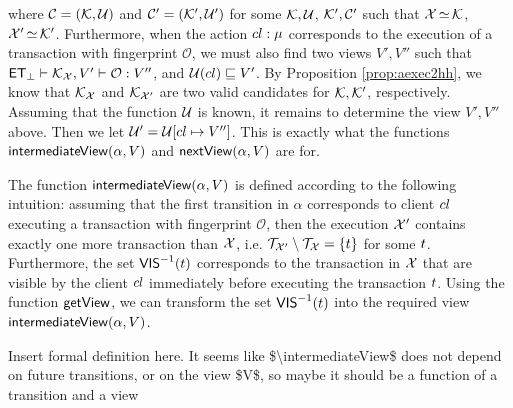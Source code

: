 where $\mathcal{C} = (\mathcal{K}, \mathcal{U})$ and $\mathcal{C}' = (\mathcal{K}', \mathcal{U}')$ 
for some $\mathcal{K}, \mathcal{U}$, $\mathcal{K}', \mathcal{C}'$ such that 
$\mathcal{X} \mathop{\simeq} \mathcal{K}$, $\mathcal{X}' \mathop{\simeq} \mathcal{K}'$. 
Furthermore, when the action $cl: \mu$ corresponds to the execution of a transaction 
with fingerprint $\mathcal{O}$, we must also find two views $V', V''$ such that 
$\mathsf{ET}_{\bot} \vdash \mathcal{K}_{\mathcal{X}}, V' \vdash \mathcal{O} : V''$, 
and $\mathcal{U}(cl) \sqsubseteq V'$.
By Proposition \ref{prop:aexec2hh}, we know that $\mathcal{K}_{\mathcal{X}}$ and 
$\mathcal{K}_{\mathcal{X}'}$ are two valid candidates for $\mathcal{K}, \mathcal{K}'$, respectively. 
Assuming that the function $\mathcal{U}$ is known, it remains to 
determine the view $V', V''$ above. Then we let 
$\mathcal{U}' = \mathcal{U}[ cl \mapsto V'']$.
This is exactly what the functions $\mathsf{intermediateView}(\alpha, V)$ 
and $\mathsf{nextView}(\alpha, V)$ are for.

The function $\mathsf{intermediateView}(\alpha, V)$ is defined according 
to the following intuition: assuming that the first transition in 
$\alpha$ corresponds to client $cl$ executing a transaction 
with fingerprint $\mathcal{O}$, then the execution $\mathcal{X}'$ 
contains exactly one more transaction than $\mathcal{X}$, i.e. 
$\mathcal{T}_{\mathcal{X}'} \setminus \mathcal{T}_{\mathcal{X}} = \{t\}$ for some $t$. 
Furthermore, the set ${\mathsf{VIS}}^{-1}(t)$ corresponds to the 
transaction in $\mathcal{X}$ that are visible by the client 
$cl$ immediately before executing the transaction $t$. 
Using the function $\mathsf{getView}$, we can transform the set 
${\mathsf{VIS}}^{-1}(t)$ into the required view $\mathsf{intermediateView}(\alpha, V)$. 

\ac{Insert formal definition here. It seems like $\intermediateView$ does 
not depend on future transitions, or on the view $V$, 
so maybe it should be a function of a transition and a view}





